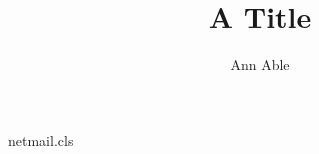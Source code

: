 \begin{filecontents*}[overwrite]{netmail.cls}
\def\@anames{}
\newtoks\email@toks
\renewcommand\author[1]{\gdef\@anames{#1}}
\newcommand\emailAdd[1]{\email@toks=\expandafter{\the\email@toks#1}}
\renewcommand\@author{\@anames\\E-mail: \the\email@toks}
\end{filecontents*}
\documentclass{netmail}

\title{A Title}
\author{Ann Able}
\maketitle
Text.

